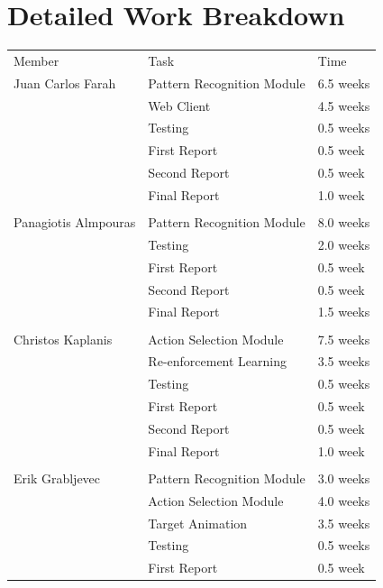\documentclass[a4paper,11pt]{article}
\begin{document}
\clearpage
\section{Detailed Work Breakdown}

\begin{table}[h]
\centering
\begin{tabular}{|l|l|l|}
\cline{1-3}
Member& Task&  Time  \\ \cline{1-3}
 Juan Carlos Farah&  Pattern Recognition Module&  6.5 weeks  \\ \cline{1-3}
&  Web Client&  4.5 weeks  \\ \cline{1-3}
& Testing& 0.5 weeks \\ \cline{1-3}
&  First Report&  0.5 week  \\ \cline{1-3}
&  Second Report&  0.5 week  \\ \cline{1-3}
&  Final Report& 1.0 week   \\ \cline{1-3}
&  &    \\ \cline{1-3}
Panagiotis Almpouras&  Pattern Recognition Module& 8.0 weeks  \\ \cline{1-3}
&  Testing&  2.0 weeks  \\ \cline{1-3}
&  First Report&  0.5 week  \\ \cline{1-3}
&  Second Report&  0.5 week  \\ \cline{1-3}
&  Final Report&  1.5 weeks  \\ \cline{1-3}
&  &    \\ \cline{1-3}
 Christos Kaplanis&  Action Selection Module&  7.5 weeks  \\ \cline{1-3}
&  Re-enforcement Learning&  3.5 weeks  \\ \cline{1-3}
& Testing& 0.5 weeks \\ \cline{1-3}
&  First Report&  0.5 week  \\ \cline{1-3}
&  Second Report&  0.5 week  \\ \cline{1-3}
&  Final Report&  1.0 week  \\ \cline{1-3}
&  &   \\ \cline{1-3}
Erik Grabljevec&  Pattern Recognition Module&  3.0 weeks  \\ \cline{1-3}
&  Action Selection Module&  4.0 weeks  \\ \cline{1-3}
&  Target Animation&  3.5 weeks  \\ \cline{1-3}
& Testing& 0.5 weeks \\ \cline{1-3}
&  First Report& 0.5 week  \\ \cline{1-3}

\end{tabular}
\end{table}
\end{document}

